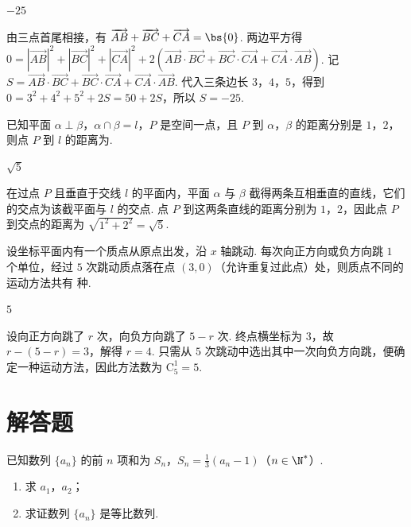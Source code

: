 \begin{answer}
\(-25\)
\end{answer}

\begin{solution}
由三点首尾相接，有
\(\overrightarrow{AB}+\overrightarrow{BC}+\overrightarrow{CA}=\bs{0}\). 两边平方得
\(0=|\overrightarrow{AB}|^2+|\overrightarrow{BC}|^2+|\overrightarrow{CA}|^2+2\left(\overrightarrow{AB}\cdot\overrightarrow{BC}+\overrightarrow{BC}\cdot\overrightarrow{CA}+\overrightarrow{CA}\cdot\overrightarrow{AB}\right)\).
记
\(S=\overrightarrow{AB}\cdot\overrightarrow{BC}+\overrightarrow{BC}\cdot\overrightarrow{CA}+\overrightarrow{CA}\cdot\overrightarrow{AB}\). 代入三条边长 \(3\)，\(4\)，\(5\)，得到
\(0=3^2+4^2+5^2+2S=50+2S\)，所以 \(S=-25\).
\end{solution}

\begin{problem}
已知平面 \(\alpha \perp \beta\)，\(\alpha \cap \beta = l\)，\(P\) 是空间一点，且 \(P\) 到 \(\alpha\)，\(\beta\) 的距离分别是 \(1\)，\(2\)，则点 \(P\) 到 \(l\) 的距离为\fillinblank{}.
\end{problem}

\begin{answer}
\(\sqrt{5}\)
\end{answer}

\begin{solution}
在过点 \(P\) 且垂直于交线 \(l\) 的平面内，平面 \(\alpha\) 与 \(\beta\) 截得两条互相垂直的直线，它们的交点为该截平面与 \(l\) 的交点. 点 \(P\) 到这两条直线的距离分别为 \(1\)，\(2\)，因此点 \(P\) 到交点的距离为
\(\sqrt{1^2+2^2}=\sqrt{5}\).
\end{solution}

\begin{problem}
设坐标平面内有一个质点从原点出发，沿 \(x\) 轴跳动. 每次向正方向或负方向跳 \(1\) 个单位，经过 \(5\) 次跳动质点落在点 \((3, 0)\)（允许重复过此点）处，则质点不同的运动方法共有\fillinblank{} 种.
\end{problem}

\begin{answer}
\(5\)
\end{answer}

\begin{solution}
设向正方向跳了 \(r\) 次，向负方向跳了 \(5-r\) 次. 终点横坐标为 \(3\)，故
\(r-(5-r)=3\)，解得 \(r=4\). 只需从 \(5\) 次跳动中选出其中一次向负方向跳，便确定一种运动方法，因此方法数为 \(\mathrm C_5^1=5\).
\end{solution}

\section{解答题}
\begin{problem}
已知数列 \(\{a_n\}\) 的前 \(n\) 项和为 \(S_n\)，\(S_n = \frac{1}{3}(a_n - 1)\)（\(n \in \N^*\)）.

\begin{enumerate}
\item 求 \(a_1\)，\(a_2\)；
\item 求证数列 \(\{a_n\}\) 是等比数列.
\end{enumerate}
\end{problem}

